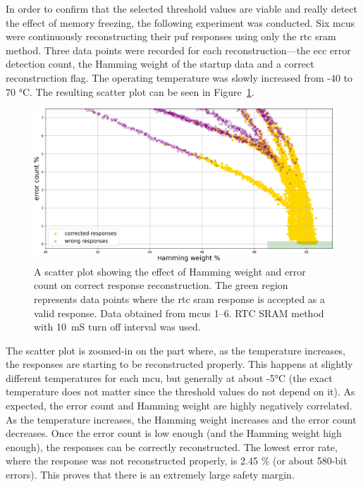 In order to confirm that the selected threshold values are viable and really detect the effect of memory freezing, the following experiment was conducted. Six \glspl{mcu} were continuously reconstructing their \gls{puf} responses using only the \gls{rtc} \gls{sram} method. Three data points were recorded for each reconstruction---the \gls{ecc} error detection count, the Hamming weight of the startup data and a correct reconstruction flag. The operating temperature was slowly increased from -40 to 70 °C. The resulting scatter plot can be seen in Figure~\ref{fig:correct_responses_plot}.

\begin{figure}[ht!]
    \centering
    \captionsetup{margin=0.5cm}
    \includegraphics[width=\textwidth]{images/correct_responses_plot.png}
    \caption[A scatter plot showing the effect of Hamming weight and error count on correct response reconstruction]{A scatter plot showing the effect of Hamming weight and error count on correct response reconstruction. The green region represents data points where the \gls{rtc} \gls{sram} response is accepted as a valid response. Data obtained from \glspl{mcu} 1--6. RTC SRAM method with 10~mS turn off interval was used.}
    \label{fig:correct_responses_plot}
\end{figure}

The scatter plot is zoomed-in on the part where, as the temperature increases, the responses are starting to be reconstructed properly. This happens at slightly different temperatures for each \gls{mcu}, but generally at about -5°C (the exact temperature does not matter since the threshold values do not depend on it). As expected, the error count and Hamming weight are highly negatively correlated. As the temperature increases, the Hamming weight increases and the error count decreases. Once the error count is low enough (and the Hamming weight high enough), the responses can be correctly reconstructed. The lowest error rate, where the response was not reconstructed properly, is 2.45 \% (or about 580-bit errors). This proves that there is an extremely large safety margin.

